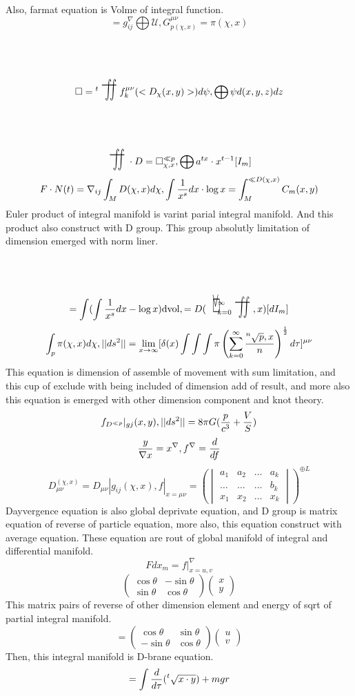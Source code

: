\documentclass{jsarticle}
\begin{document}
  Also, farmat equation is Volme of integral function.
  $$ = g_{ij}^{\nabla} \bigoplus \mathcal{U}, 
   G^{\mu\nu}_{p(\chi,x)} = \pi(\chi,x) $$
  $$ \square = {}^{t}\scalebox{1}[2]{\variint}f^{\mu\nu}_{k}(<D_{\chi}
  (x,y)>)d\psi, 
   \bigoplus \mathcal{\psi}d(x,y,z)dz $$
  $$ \scalebox{1}[2]{\variint} \cdot D = \square^{\ll p}_{\chi,x}, 
   \bigoplus a^{tx}\cdot x^{t - 1}[I_m] $$
  $$ F\cdot N(t) = \nabla_{ij}\int_M D(\chi,x)d\chi, 
   \int {1 \over {x^s}}dx \cdot \log x = \int_M^{\ll D(\chi,x)}C_m(x,y) $$
   Euler product of integral manifold is varint parial integral manifold.
   And this product also construct with D group.
   This group absolutly limitation of dimension emerged with norm liner.
  $$ = \int (\int {1 \over {x^s}}dx - \log x)\mathrm{dvol}, 
   = D (\scalebox{1}[2]{\letter}^{\infty}_{k=0} \scalebox{1}[2]{\variint}
  ,x)[dI_m] $$
  $$ \int_{p}\pi(\chi,x)d\chi, 
   ||ds^2|| = \lim_{x \to \infty} [\delta(x) \int \int \int \pi \left( \sum_{k=0}^{\infty}
		{{}^n\sqrt{p},x \over n} \right)
^{1 \over 2}d \tau]^{\mu\nu} $$
This equation is dimension of assemble of movement with sum limitation,
and this cup of exclude with being included of dimension add of result,
and more also this equation is emerged with other dimension component
and knot theory.
  $$ f_{{D}^{\ll p}}|_{gj} (x,y), 
  ||ds^2|| = 8 \pi G({p \over c^3} + {V \over S}) $$
  $$ {y \over {\nabla x}} = x^{\nabla}, 
   f^{\nabla} = {d \over {d f}} $$
  $$ D^{(\chi,x)}_{\mu\nu} = D_{\mu\nu}|g_{ij}(\chi,x), 
   f|_{x=\mu\nu} = {\left(\begin{vmatrix} a_1 & a_2 &\dots & a_k \\
	  \dots & \dots &  \dots & b_k \\
  x_1 & x_2 & \dots & x_k \end{vmatrix} \right)}^{\oplus L} $$
  Dayvergence equation is also global deprivate equation,
  and D group is matrix equation of reverse of particle equation,
  more also, this equation construct with average equation.
  These equation are rout of global manifold of integral and differential
  manifold.
  $$ F dx_m = f|^{\nabla}_{x=u,v} $$
  $$ \begin{pmatrix} \cos \theta & -\sin \theta \\
  \sin \theta & \cos \theta \end{pmatrix} \begin{pmatrix} x \\
  y \end{pmatrix} $$
  This matrix pairs of reverse of other dimension element and
  energy of sqrt of partial integral manifold.
  $$ = \begin{pmatrix} \cos \theta & \sin \theta \\
  - \sin \theta & \cos \theta \end{pmatrix} \begin{pmatrix} u \\
  v \end{pmatrix} $$
  Then, this integral manifold is D-brane equation.
  $$ = \int {d \over {d \tau}}{({}^{t}\sqrt{x\cdot y})} + mgr $$
\end{document}
